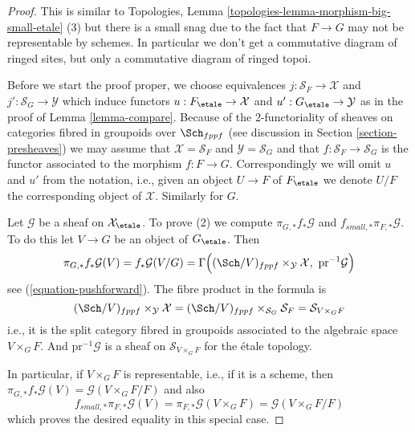 \begin{proof}
This is similar to
Topologies, Lemma \ref{topologies-lemma-morphism-big-small-etale} (3)
but there is a small snag due to the fact that $F \to G$ may not be
representable by schemes. In particular we don't get a commutative diagram
of ringed sites, but only a commutative diagram of ringed topoi.

\medskip\noindent
Before we start the proof proper, we choose equivalences
$j : \mathcal{S}_F \to \mathcal{X}$ and
$j' : \mathcal{S}_G \to \mathcal{Y}$ which induce functors
$u : F_\etale \to \mathcal{X}$ and
$u' : G_\etale \to \mathcal{Y}$ as in the proof of
Lemma \ref{lemma-compare}. Because of the 2-functoriality of
sheaves on categories fibred in groupoids over $\Sch_{fppf}$
(see discussion in Section \ref{section-presheaves})
we may assume that $\mathcal{X} = \mathcal{S}_F$ and
$\mathcal{Y} = \mathcal{S}_G$ and that $f : \mathcal{S}_F \to \mathcal{S}_G$
is the functor associated to the morphism $f : F \to G$. Correspondingly
we will omit $u$ and $u'$ from the notation, i.e., given an object
$U \to F$ of $F_\etale$ we denote $U/F$
the corresponding object of $\mathcal{X}$. Similarly for $G$.

\medskip\noindent
Let $\mathcal{G}$ be a sheaf on $\mathcal{X}_\etale$.
To prove (2) we compute $\pi_{G, *}f_*\mathcal{G}$ and
$f_{small, *}\pi_{F, *}\mathcal{G}$. To do this let $V \to G$ be an object
of $G_\etale$. Then
$$
\pi_{G, *}f_*\mathcal{G}(V) = f_*\mathcal{G}(V/G) =
\Gamma\Big(
(\Sch/V)_{fppf} \times_{\mathcal{Y}} \mathcal{X},
\ \text{pr}^{-1}\mathcal{G}\Big)
$$
see (\ref{equation-pushforward}). The fibre product in the formula is
$$
(\Sch/V)_{fppf} \times_{\mathcal{Y}} \mathcal{X} =
(\Sch/V)_{fppf} \times_{\mathcal{S}_G} \mathcal{S}_F =
\mathcal{S}_{V \times_G F}
$$
i.e., it is the split category fibred in groupoids associated to the
algebraic space $V \times_G F$. And $\text{pr}^{-1}\mathcal{G}$ is a
sheaf on $\mathcal{S}_{V \times_G F}$ for the \'etale topology.

\medskip\noindent
In particular, if $V \times_G F$ is representable, i.e., if it is a scheme,
then $\pi_{G, *}f_*\mathcal{G}(V) = \mathcal{G}(V \times_G F/F)$ and
also
$$
f_{small, *}\pi_{F, *}\mathcal{G}(V) =
\pi_{F, *}\mathcal{G}(V \times_G F) =
\mathcal{G}(V \times_G F/F)
$$
which proves the desired equality in this special case.


\end{proof}
